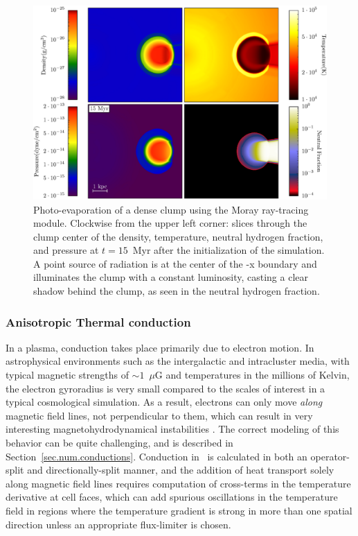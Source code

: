 \begin{figure}
  \centering
  \includegraphics[width=1.0\textwidth]{figures/code-test-shadowing.eps}
  \caption{Photo-evaporation of a dense clump using the Moray
ray-tracing module.  Clockwise from the upper left corner: slices
through the clump center of the density, temperature, neutral hydrogen
fraction, and pressure at $t=15$~Myr after the initialization of the
simulation.  A point source of radiation is at the center of the -x
boundary and illuminates the clump with a constant luminosity, casting
a clear shadow behind the clump, as seen in the neutral hydrogen
fraction.}
  \label{fig:shadowing}
\end{figure}





\subsubsection{Anisotropic Thermal conduction}
\label{sec.tests.conduct}

In a plasma, conduction takes place primarily due to electron motion.
In astrophysical environments such as the intergalactic and
intracluster media, with typical magnetic strengths of $\sim 1$~$\mu$G
and temperatures in the millions of Kelvin, the electron gyroradius is
very small compared to the scales of interest in a typical
cosmological simulation.  As a result, electrons can only move
\textit{along} magnetic field lines, not perpendicular to them, which
can result in very interesting magnetohydrodynamical instabilities
\citep[e.g.,][]{2008ApJ...677L...9P,2008ApJ...688..905P}.  The correct
modeling of this behavior can be quite challenging, and is described
in Section~\ref{sec.num.conductions}.  Conduction in \enzo\ is
calculated in both an operator-split and directionally-split manner,
and the addition of heat transport solely along magnetic field lines
requires computation of cross-terms in the temperature derivative at
cell faces, which can add spurious oscillations in the temperature
field in regions where the temperature gradient is strong in more than
one spatial direction unless an appropriate flux-limiter \citep[such
as that of][]{1977JCoPh..23..263V} is chosen.

